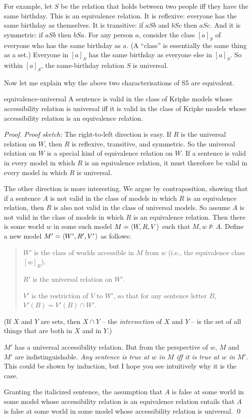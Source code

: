 For example, let $S$ be the relation that holds between two people iff they have
the same birthday. This is an equivalence relation. It is reflexive: everyone
has the same birthday as themselves. It is transitive: if $aSb$ and $bSc$ then
$aSc$. And it is symmetric: if $aSb$ then $bSa$. For any person $a$, consider
the class $[a]_S$ of everyone who has the same birthday as $a$. (A ``class'' is
essentially the same thing as a set.) Everyone in $[a]_S$ has the same birthday
as everyone else in $[a]_S$. So within $[a]_S$, the same-birthday relation $S$
is universal.

Now let me explain why the above two characterisations of S5 are equivalent.

\begin{observation}{equivalence-universal}
  A sentence is valid in the class of Kripke models whose accessibility relation
  is universal iff it is valid in the class of Kripke models whose accessibility
  relation is an equivalence relation.
\end{observation}
%
\begin{proof}
  \emph{Proof sketch:} The right-to-left direction is easy. If $R$ is the universal
  relation on $W$, then $R$ is reflexive, transitive, and symmetric. So the
  universal relation on $W$ is a special kind of equivalence relation on $W$. If
  a sentence is valid in every model in which $R$ is an equivalence relation, it
  must therefore be valid in every model in which $R$ is universal.

  The other direction is more interesting. We argue by contraposition, showing
  that if a sentence $A$ is not valid in the class of models in which $R$ is an
  equivalence relation, then $R$ is also not valid in the class of universal
  models. So assume $A$ is not valid in the class of models in which $R$ is an
  equivalence relation. Then there is some world $w$ in some such model
  $M = \t{W,R,V}$ such that $M,w \not\models A$. Define a new model
  $M' = \t{W',R',V'}$ as follows:
  \begin{quote}
    $W'$ is the class of worlds accessible in $M$ from $w$ (i.e., the
    equivalence class $[w]_R$).

    $R'$ is the universal relation on $W'$.

    $V'$ is the restriction of $V$ to $W'$, so that for any sentence letter $B$,
    $V'(B) = V'(B) \cap W'$.
  \end{quote}
  (If $X$ and $Y$ are sets, then $X \cap Y$ -- the \emph{intersection} of $X$ and
  $Y$ -- is the set of all things that are both in $X$ and in $Y$.)

  $M'$ has a universal accessibility relation. But from the perspective of $w$,
  $M$ and $M'$ are indistinguishable. \emph{Any sentence is true at $w$ in $M$ iff
    it is true at $w$ in $M'$.} This could be shown by induction, but I hope you
  see intuitively why it is the case.

  Granting the italicized sentence, the assumption that $A$ is false at some
  world in some model whose accessibility relation is an equivalence relation
  entails that $A$ is false at some world in some model whose accessibility
  relation is universal. \qed
\end{proof}

